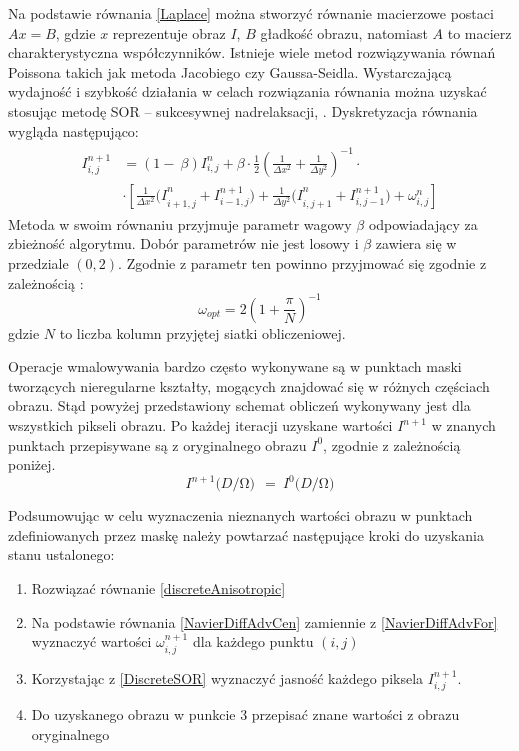 \documentclass[12pt, twoside, openany]{report}
\theoremstyle{definition}
\begin{document}
Na podstawie równania \eqref{Laplace} można stworzyć równanie macierzowe postaci $Ax=B$, gdzie $x$ reprezentuje obraz $I$, $B$ gładkość obrazu, natomiast $A$ to macierz charakterystyczna współczynników. Istnieje wiele metod rozwiązywania równań Poissona takich jak metoda Jacobiego czy Gaussa-Seidla.  Wystarczającą wydajność i szybkość działania w celach rozwiązania równania można uzyskać stosując metodę SOR – sukcesywnej nadrelaksacji, \cite{blacksuccessive}. Dyskretyzacja równania wygląda następująco:
\begin{align}
\begin{aligned}
I^{n+1}_{i,j}
&= \left(1-\ \beta \right)I^n_{i,j}+\beta \cdot \frac{1}{2}{\left(\frac{1}{\Delta x^2}+\frac{1}{\Delta y^2}\right)}^{-1} \cdot \\[1ex]
&\cdot \left[\frac{1}{\Delta x^2}{(I}^n_{i+1,j}+I^{n+1}_{i-1,j})+\frac{1}{\Delta y^2}{(I}^n_{i,j+1}+I^{n+1}_{i,j-1})+{\omega }^n_{i,j}\right]
\end{aligned}
\label{DiscreteSOR}
\end{align}
Metoda w swoim równaniu przyjmuje parametr wagowy $\beta$ odpowiadający za zbieżność algorytmu. Dobór parametrów nie jest losowy i $\beta$ zawiera się w przedziale $(0,2)$. Zgodnie z \cite{blacksuccessive} parametr ten powinno przyjmować się zgodnie z zależnością \cite{ancona2002computational}:
\begin{equation}
{\omega }_{opt}=2{\left(1+\frac{\pi }{N}\right)}^{-1}
\label{BetaChoose}
\end{equation}
gdzie $N$ to liczba kolumn przyjętej siatki obliczeniowej. 
\par
Operacje wmalowywania bardzo często wykonywane są w punktach maski tworzących nieregularne kształty, mogących znajdować się w różnych częściach obrazu. Stąd powyżej przedstawiony schemat obliczeń wykonywany jest dla wszystkich pikseli obrazu. Po każdej iteracji uzyskane wartości $I^{n+1}$ w znanych punktach przepisywane są z oryginalnego obrazu $I^{0}$, zgodnie z zależnością poniżej.
\begin{equation}
I^{n+1}(D/\mathrm{\Omega }\mathrm{)\ }\ ={\ I}^0(D/\mathrm{\Omega }\mathrm{)}
\label{retrieveMask}
\end{equation}
\par
Podsumowując w celu wyznaczenia nieznanych wartości obrazu w punktach zdefiniowanych przez maskę należy powtarzać następujące kroki do uzyskania stanu ustalonego:
\begin{enumerate}
\item
Rozwiązać równanie \eqref{discreteAnisotropic} 
\item
Na podstawie równania \eqref{NavierDiffAdvCen} zamiennie z \eqref{NavierDiffAdvFor} wyznaczyć wartości $\omega_{i,j}^{n+1}$ dla każdego punktu $(i,j)$ 
\item
Korzystając z \eqref{DiscreteSOR} wyznaczyć jasność każdego piksela $I_{i,j}^{n+1}$.
\item
Do uzyskanego obrazu w punkcie 3 przepisać znane wartości z obrazu oryginalnego
\end{enumerate}
\end{document}
